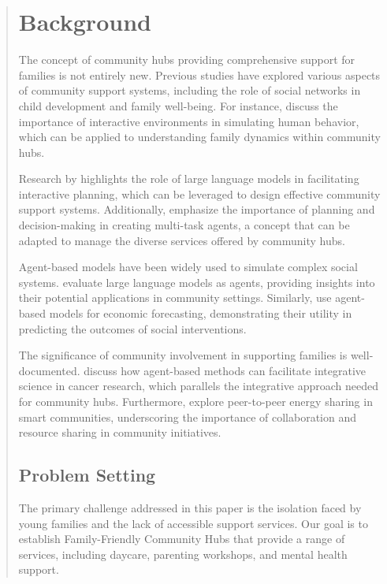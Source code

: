 \documentclass{article} %
\begin{document}
\begin{abstract}
\section{Background}
\label{sec:background}

The concept of community hubs providing comprehensive support for families is not entirely new. Previous studies have explored various aspects of community support systems, including the role of social networks in child development and family well-being. For instance, \citet{park2023generative} discuss the importance of interactive environments in simulating human behavior, which can be applied to understanding family dynamics within community hubs.

Research by \citet{shanahan2023role} highlights the role of large language models in facilitating interactive planning, which can be leveraged to design effective community support systems. Additionally, \citet{wang2023describe} emphasize the importance of planning and decision-making in creating multi-task agents, a concept that can be adapted to manage the diverse services offered by community hubs.

Agent-based models have been widely used to simulate complex social systems. \citet{liu2023agentbench} evaluate large language models as agents, providing insights into their potential applications in community settings. Similarly, \citet{poledna2023economic} use agent-based models for economic forecasting, demonstrating their utility in predicting the outcomes of social interventions.

The significance of community involvement in supporting families is well-documented. \citet{west2023agent} discuss how agent-based methods can facilitate integrative science in cancer research, which parallels the integrative approach needed for community hubs. Furthermore, \citet{zhou2023peer} explore peer-to-peer energy sharing in smart communities, underscoring the importance of collaboration and resource sharing in community initiatives.

\subsection{Problem Setting}
\label{sec:problem_setting}

The primary challenge addressed in this paper is the isolation faced by young families and the lack of accessible support services. Our goal is to establish Family-Friendly Community Hubs that provide a range of services, including daycare, parenting workshops, and mental health support.


\end{abstract}
\end{document}
